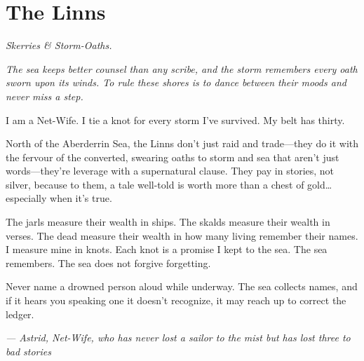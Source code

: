 \newpage

\newpage

\chapter{The Linns}
\emph{Skerries \& Storm-Oaths.}

\noindent
{\Large
\textit{The sea keeps better counsel than any scribe, and the storm remembers every oath sworn upon its winds. To rule these shores is to dance between their moods and never miss a step.}

\vspace{0.5em}

I am a Net-Wife. I tie a knot for every storm I've survived. My belt has thirty.

\vspace{0.5em}

North of the Aberderrin Sea, the Linns don't just raid and trade---they do it with the fervour of the converted, swearing oaths to storm and sea that aren't just words---they're leverage with a supernatural clause. They pay in stories, not silver, because to them, a tale well-told is worth more than a chest of gold\dots especially when it's true.

\vspace{0.5em}

The jarls measure their wealth in ships. The skalds measure their wealth in verses. The dead measure their wealth in how many living remember their names. I measure mine in knots. Each knot is a promise I kept to the sea. The sea remembers. The sea does not forgive forgetting.

\vspace{0.5em}

Never name a drowned person aloud while underway. The sea collects names, and if it hears you speaking one it doesn't recognize, it may reach up to correct the ledger.

\vspace{1em}

\noindent\textit{--- Astrid, Net-Wife, who has never lost a sailor to the mist but has lost three to bad stories}
}

\vspace{1em}


